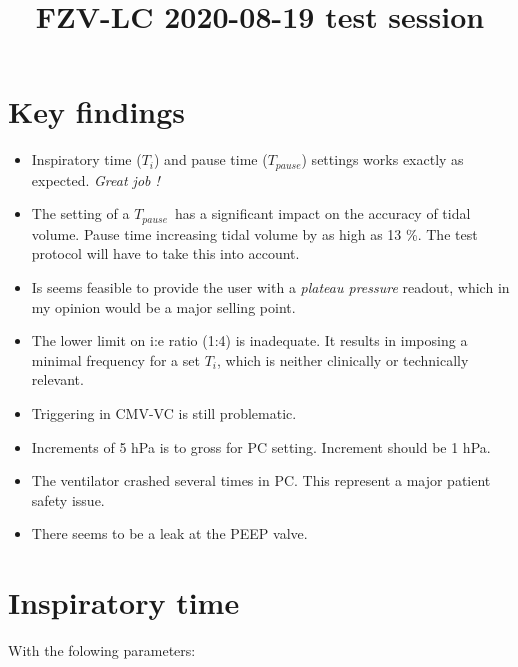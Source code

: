 \documentclass{nrepport}
\title{FZV-LC 2020-08-19 test session}
\author{\nsignf}
\def\tp{$T_{pause}$}
\begin{document}
\tpblock
\maketitle

\tableofcontents

\section*{Key findings}

\begin{itemize}
	\item Inspiratory time ($T_i$) and pause time ($T_{pause}$) settings
		works exactly as expected. \emph{Great job !}
	\item The setting of a \tp\ has a significant impact on the accuracy of
		tidal volume. Pause time increasing tidal volume by as high as
		13 \%. The test protocol will have to take this into account.
	\item Is seems feasible to provide the user with a \emph{plateau
		pressure} readout, which in my opinion would be a major selling
		point.
	\item The lower limit on i:e ratio (1:4) is inadequate. It results
		in imposing a minimal frequency for a set $T_i$, which is neither
		clinically or technically relevant.
	\item Triggering in CMV-VC is still problematic.
	\item Increments of 5 hPa is to gross for PC setting. Increment
		should be 1 hPa.
	\item The ventilator crashed several times in PC. This represent a
		major patient safety issue.
	\item There seems to be a leak at the PEEP valve.
\end{itemize}

\cleardoublepage

\section{Inspiratory time}

With the folowing parameters:

\end{document}
